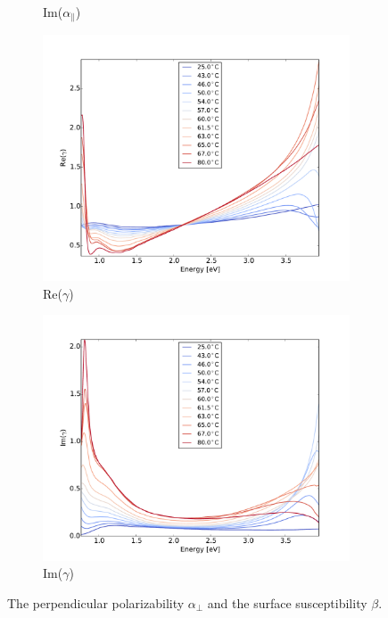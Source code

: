 \begin{figure}[h!]
\begin{subfigure}[b]{0.49\textwidth}
        \caption{Im($\alpha_{\parallel}$)}
        \label{fig:2}
    \end{subfigure}
    \begin{subfigure}[b]{0.49\textwidth}
        \centering
        \includegraphics[width=\textwidth]{Results/Sim3/re_gamma.pdf}
        \caption{Re($\gamma$)}
        \label{fig:2}
    \end{subfigure}
    \begin{subfigure}[b]{0.49\textwidth}
        \centering
        \includegraphics[width=\textwidth]{Results/Sim3/im_gamma.pdf}
        \caption{Im($\gamma$)}
        \label{fig:2}
    \end{subfigure}
    \caption{
       The perpendicular polarizability  $\alpha_{\perp}$ and the surface susceptibility $\beta$.
    }
    \label{fig:alphaBeta}
\end{figure}
